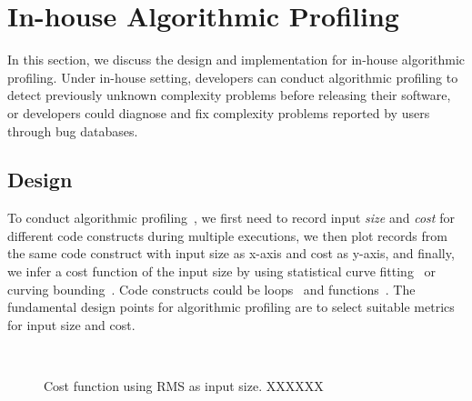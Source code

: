 \section{In-house Algorithmic Profiling}
\label{sec:inhouse}

In this section, we discuss the design and implementation for in-house algorithmic profiling.
Under in-house setting, 
developers can conduct algorithmic profiling 
to detect previously unknown complexity problems before releasing their software, 
or developers could diagnose and fix complexity problems 
reported by users through bug databases.


\subsection{Design}
To conduct algorithmic profiling~\cite{Aprof1,Aprof2,AlgoProf},
we first need to record input \textit{size} and \textit{cost} for different code constructs 
during multiple executions,
we then plot records from the same code construct with input size as x-axis and cost as y-axis, 
and finally, we infer a cost function of the input size by using 
statistical curve fitting~\cite{curve-fitting} 
or curving bounding~\cite{curve-bounding}. 
Code constructs could be loops~\cite{AlgoProf} and functions~\cite{Aprof1,Aprof2}. 
The fundamental design points for algorithmic 
profiling are to select suitable metrics for input size and cost. 

\begin{figure}
\centering
{} 
 \\ 
\vspace{-0.1in}
\caption{Cost function using RMS as input size. XXXXXX} 
\label{fig:heat} 
\end{figure} 


